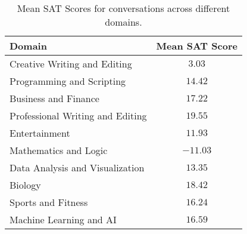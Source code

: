 \begin{table}[ht!]
\centering
\small 
\begin{tabular}{l c}
\toprule
\textbf{Domain} & \textbf{Mean SAT Score} \\
\midrule
Creative Writing and Editing & $3.03$ \\
Programming and Scripting & $14.42$ \\
Business and Finance & $17.22$ \\
Professional Writing and Editing & $19.55$ \\
Entertainment & $11.93$ \\
Mathematics and Logic & $-11.03$ \\
Data Analysis and Visualization & $13.35$ \\
Biology & $18.42$ \\
Sports and Fitness & $16.24$ \\
Machine Learning and AI & $16.59$ \\
\bottomrule
\end{tabular}
\caption{Mean SAT Scores for conversations across different domains.}
\label{tab:mean_sat}
\end{table}